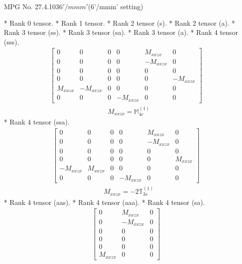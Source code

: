 \documentclass[fleqn,8pt,landscape]{jsarticle}
\begin{document}
\setcounter{MaxMatrixCols}{32}

\renewcommand{\tablename}{Table~}
\renewcommand{\figurename}{Figure~}
\begin{center}
\LARGE
MPG No. 27.4.103\quad$6'/mmm'$\quad(6'/mmm' setting)
\end{center}
* Rank 0 tensor.
* Rank 1 tensor.
* Rank 2 tensor (s).
* Rank 2 tensor (a).
* Rank 3 tensor (ss).
* Rank 3 tensor (sa).
* Rank 3 tensor (a).
* Rank 4 tensor (sss).
\begin{align*}
\begin{bmatrix} 0 & 0 & 0 & 0 & M_{xxzx} & 0 \\ 0 & 0 & 0 & 0 & - M_{xxzx} & 0 \\ 0 & 0 & 0 & 0 & 0 & 0 \\ 0 & 0 & 0 & 0 & 0 & - M_{xxzx} \\ M_{xxzx} & - M_{xxzx} & 0 & 0 & 0 & 0 \\ 0 & 0 & 0 & - M_{xxzx} & 0 & 0 \end{bmatrix}
\end{align*}
\begin{align*}
& M_{xxzx} = \mathbb{M}_{4c}^{(1)}
\end{align*}
* Rank 4 tensor (ssa).
\begin{align*}
\begin{bmatrix} 0 & 0 & 0 & 0 & M_{xxzx} & 0 \\ 0 & 0 & 0 & 0 & - M_{xxzx} & 0 \\ 0 & 0 & 0 & 0 & 0 & 0 \\ 0 & 0 & 0 & 0 & 0 & M_{xxzx} \\ - M_{xxzx} & M_{xxzx} & 0 & 0 & 0 & 0 \\ 0 & 0 & 0 & - M_{xxzx} & 0 & 0 \end{bmatrix}
\end{align*}
\begin{align*}
& M_{xxzx} = - 2 \mathbb{T}_{3s}^{(1)}
\end{align*}
* Rank 4 tensor (aas).
* Rank 4 tensor (aaa).
* Rank 4 tensor (sa).
\begin{align*}
\begin{bmatrix} 0 & M_{xxzx} & 0 \\ 0 & - M_{xxzx} & 0 \\ 0 & 0 & 0 \\ 0 & 0 & 0 \\ 0 & 0 & 0 \\ M_{xxzx} & 0 & 0 \end{bmatrix}
\end{align*}
\end{document}
